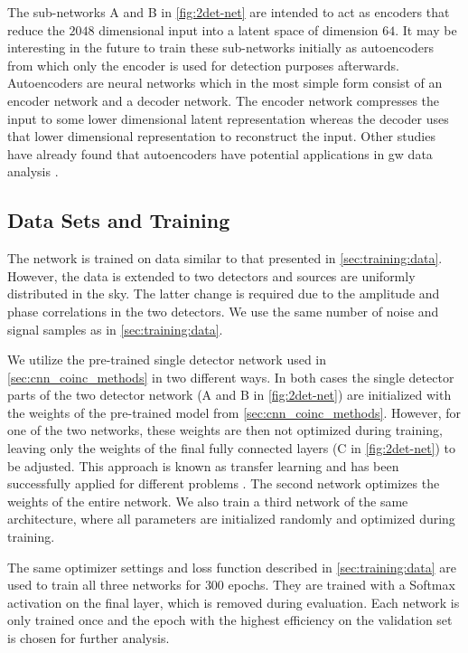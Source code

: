 The sub-networks A and B in \autoref{fig:2det-net} are intended to act as encoders that reduce the $2048$ dimensional input into a latent space of dimension $64$. It may be interesting in the future to train these sub-networks initially as autoencoders \cite{Kramer:1991aaa} from which only the encoder is used for detection purposes afterwards. Autoencoders are neural networks which in the most simple form consist of an encoder network and a decoder network. The encoder network compresses the input to some lower dimensional latent representation whereas the decoder uses that lower dimensional representation to reconstruct the input. Other studies have already found that autoencoders have potential applications in \acrshort{gw} data analysis \cite{Shen:2019ohi, Gabbard:2019rde}.

\subsection{Data Sets and Training}
The network is trained on data similar to that presented in \autoref{sec:training:data}. However, the data is extended to two detectors and sources are uniformly distributed in the sky. The latter change is required due to the amplitude and phase correlations in the two detectors. We use the same number of noise and signal samples as in \autoref{sec:training:data}.

We utilize the pre-trained single detector network used in \autoref{sec:cnn_coinc_methods} in two different ways. In both cases the single detector parts of the two detector network (A and B in \autoref{fig:2det-net}) are initialized with the weights of the pre-trained model from \autoref{sec:cnn_coinc_methods}. However, for one of the two networks, these weights are then not optimized during training, leaving only the weights of the final fully connected layers (C in \autoref{fig:2det-net}) to be adjusted. This approach is known as transfer learning \cite{Weiss:2016aaa} and has been successfully applied for different problems \cite{Tan:2018aaa, George:2018awu, Mesuga:2021qeq}. The second network optimizes the weights of the entire network. We also train a third network of the same architecture, where all parameters are initialized randomly and optimized during training.

The same optimizer settings and loss function described in \autoref{sec:training:data} are used to train all three networks for $300$ epochs. They are trained with a Softmax activation on the final layer, which is removed during evaluation. Each network is only trained once and the epoch with the highest efficiency on the validation set is chosen for further analysis.

